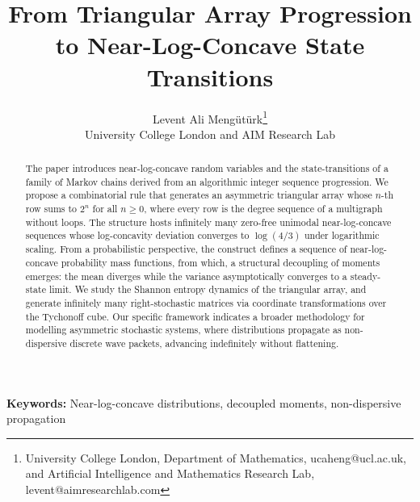 \documentclass[a4paper,12pt]{article}
\begin{document}
\title{From Triangular Array Progression\\
to Near-Log-Concave State Transitions}
\author{Levent Ali Meng\"ut\"urk\thanks{University College London, Department of Mathematics, ucaheng@ucl.ac.uk, and Artificial Intelligence and Mathematics Research Lab, levent@aimresearchlab.com} \\ \small University College London and AIM Research Lab
}
\date{}
\maketitle
\begin{abstract}
The paper introduces near-log-concave random variables and the state-transitions of a family of Markov chains derived from an algorithmic integer sequence progression. We propose a combinatorial rule that generates an asymmetric triangular array whose $n$-th row sums to $2^{n}$ for all $n \geq 0$, where every row is the degree sequence of a multigraph without loops. The structure hosts infinitely many zero-free unimodal near-log-concave sequences whose log-concavity deviation converges to $\log(4/3)$ under logarithmic scaling. From a probabilistic perspective, the construct defines a sequence of near-log-concave probability mass functions, from which, a structural decoupling of moments emerges: the mean diverges while the variance asymptotically converges to a steady-state limit. We study the Shannon entropy dynamics of the triangular array, and generate infinitely many right-stochastic matrices via coordinate transformations over the Tychonoff cube. Our specific framework indicates a broader methodology for modelling asymmetric stochastic systems, where distributions propagate as non-dispersive discrete wave packets, advancing indefinitely without flattening.
\end{abstract}
{\bf Keywords:} Near-log-concave distributions, decoupled moments, non-dispersive propagation
\end{document}
